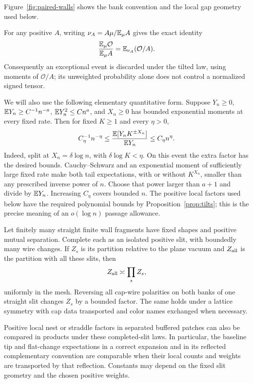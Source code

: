 Figure~\ref{fig:paired-walls} shows the bank convention and the
local gap geometry used below.


\begin{remark}
\label{obs:normalization}
For any positive $A$, writing $\nu_A=A\mu/\mathbb E_\mu A$ gives the exact
identity
\[
 \frac{\mathbb E_\mu\mathcal O}{\mathbb E_\mu A}
       =\mathbb E_{\nu_A}(\mathcal O/A).
\]
Consequently an exceptional event is discarded under the tilted law,
using moments of $\mathcal O/A$; its unweighted probability alone
does not control a normalized signed tensor.

We will also use the following elementary quantitative form.  Suppose
$Y_n\ge0$, $\mathbb E Y_n\ge C^{-1}n^{-a}$,
$\mathbb E Y_n^2\le Cn^a$, and $X_n\ge0$ has bounded exponential moments
at every fixed rate.  Then for fixed $K\ge1$ and every $\eta>0$,
\begin{equation}
 C_\eta^{-1}n^{-\eta}
 \le\frac{\mathbb E[Y_nK^{\pm X_n}]}{\mathbb E Y_n}
 \le C_\eta n^\eta.
 \label{obs:absorb-passages}
\end{equation}
Indeed, split at $X_n=\delta\log n$, with
$\delta\log K<\eta$.  On this event the extra factor has the desired
bounds.  Cauchy--Schwarz and an exponential moment of sufficiently
large fixed rate make both tail expectations, with or without
$K^{X_n}$, smaller than any prescribed inverse power of $n$.
Choose that power larger than $a+1$ and divide by $\mathbb E Y_n$.
Increasing $C_\eta$ covers bounded $n$.  The positive local factors
used below have the required polynomial bounds by
Proposition~\ref{prop:tilts}; this is the precise meaning of an
$o(\log n)$ passage allowance.
\end{remark}

\begin{lemma}
\label{lem:obs-surface}
Let finitely many straight finite wall fragments have fixed shapes
and positive mutual separation.  Complete each as an isolated
positive slit, with boundedly many wire changes.  If $Z_s$ is its
partition relative to the plane vacuum and $Z_{\rm all}$ is the
partition with all these slits, then
\begin{equation}
 Z_{\rm all}\asymp\prod_s Z_s,
 \label{obs:surface-product}
\end{equation}
uniformly in the mesh.  Reversing all cap-wire polarities on both
banks of one straight slit changes $Z_s$ by a bounded factor.
The same holds under a lattice symmetry with cap data transported
and color names exchanged when necessary.

Positive local nest or straddle factors in separated buffered patches
can also be compared in products under these completed-slit laws.
In particular, the baseline tip and flat-change expectations in a
correct expansion and in its reflected complementary convention
are comparable when their local counts and weights are transported
by that reflection.  Constants may depend on the fixed slit geometry
and the chosen positive weights.
\end{lemma}

